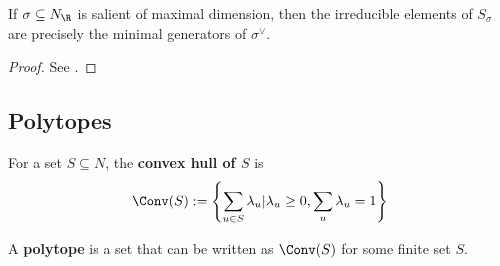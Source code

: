 \begin{proposition}
  \label{1-2-22-irred-dual-lat}

  If $\sigma \subseteq N_\R$ is salient of maximal dimension, then the irreducible elements of $S_\sigma$ are precisely the minimal generators of $\sigma^\vee$.
\end{proposition}
\begin{proof}

  See \cite{Cox_2011}.
\end{proof}

\subsection{Polytopes}

\begin{definition}
  \label{1-2-2-convex-hull}
  \uses{}
  \leanok
  For a set $S \subseteq N$, the {\bf convex hull of $S$} is
  $$\Conv(S) := \left\{\sum_{u \in S} \lambda_u | \lambda_u \ge 0, \sum_u \lambda_u = 1\right\}$$
\end{definition}

\begin{definition}[Polytope]
  \label{1-2-2-polytope}
  \leanok
  A {\bf polytope} is a set that can be written as $\Conv(S)$ for
  some finite set $S$.
\end{definition}
